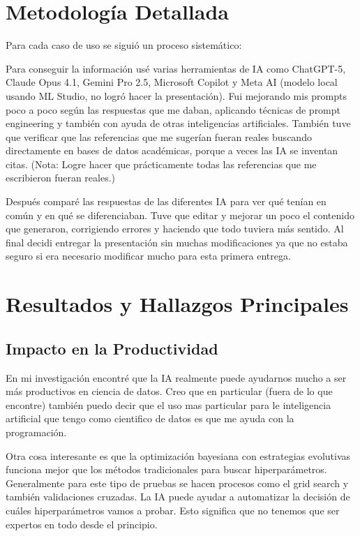 \documentclass[11pt]{article}
\begin{document}
\section*{Metodolog\'ia Detallada}

Para cada caso de uso se sigui\'o un proceso sistem\'atico:

Para conseguir la informaci\'on us\'e varias herramientas de IA como ChatGPT-5, Claude Opus 4.1, Gemini Pro 2.5, Microsoft Copilot y Meta AI (modelo local usando ML Studio, no logró hacer la presentación).
Fui mejorando mis prompts poco a poco seg\'un las respuestas que me daban, aplicando t\'ecnicas de prompt engineering y también con ayuda de otras inteligencias artificiales.
Tambi\'en tuve que verificar que las referencias que me suger\'ian fueran reales buscando directamente en bases de datos acad\'emicas, porque a veces las IA se inventan citas.
(Nota: Logre hacer que pr\'acticamente todas las referencias que me escribieron fueran reales.)

Despu\'es compar\'e las respuestas de las diferentes IA para ver qu\'e ten\'ian en com\'un y en qu\'e se diferenciaban.
Tuve que editar y mejorar un poco el contenido que generaron, corrigiendo errores y haciendo que todo tuviera m\'as sentido.
Al final decidi entregar la presentación sin muchas modificaciones ya que no estaba seguro si era necesario modificar mucho para esta primera entrega.

\section*{Resultados y Hallazgos Principales}

\subsection*{Impacto en la Productividad}

En mi investigaci\'on encontr\'e que la IA realmente puede ayudarnos mucho a ser m\'as productivos en ciencia de datos.
Creo que en particular (fuera de lo que encontre) también puedo decir que el uso mas particular para le inteligencia artificial que tengo como cientifico de datos es que me ayuda con la programación.

Otra cosa interesante es que la optimizaci\'on bayesiana con estrategias evolutivas funciona mejor que los m\'etodos tradicionales para buscar hiperpar\'ametros.
Generalmente para este tipo de pruebas se hacen procesos como el grid search y también validaciones cruzadas.
La IA puede ayudar a automatizar la decisión de cu\'ales hiperpar\'ametros vamos a probar.
Esto significa que no tenemos que ser expertos en todo desde el principio.
\end{document}
